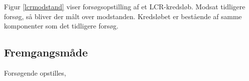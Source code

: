 Figur \ref{lcrmodstand} viser forsøgsopstilling af et LCR-kredsløb. Modsat tidligere forsøg, så bliver der målt over modstanden. Kredsløbet er bestående af samme komponenter som det tidligere forsøg.

\subsection{Fremgangsmåde}

Forsøgende opstilles, 